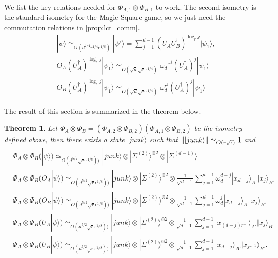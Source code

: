 \documentclass[11pt,letterpaper]{article}
\newcommand{\ket}[1]{|#1\rangle}
\newcommand{\x}{\otimes}
\newcommand{\ct}{^{\dagger}}
\DeclarePairedDelimiter{\norm}{\lVert}{\rVert}
\newcommand{\1}{\mathbb{1}}
\newcommand{\EPR}[1]{\Sigma^{(#1)}}
\newcommand{\ep}{\epsilon}
\newcommand{\se}{\sqrt{\epsilon}}
\newcommand{\qe}{\epsilon^{1/4}}
\newcommand{\sd}{\sqrt{d}}
\newcommand{\sr}{\sqrt{r}}
\newcommand{\appd}[1]{\simeq_{#1}}
\newtheorem{theorem}{Theorem}
\theoremstyle{definition}
\begin{document}
We list the key relations needed for $\Phi_{A,1} \x \Phi_{B,1}$ to work.
The second isometry is the standard isometry for the Magic Square game, so we just need the commutation relations in
\cref{prop:lct_comm}.
\begin{align}
	&\ket{\psi} \appd{O(d^{7/4} r^{1/4} \ep^{1/8})}\ket{\psi'} = \sum_{j=1}^{d-1} (U_A\ct U_B\ct)^{\log_r j} \ket{\psi_1},\\
	&O_A(U_A\ct)^{\log_r j} \ket{\psi_1} \appd{O(\sd \sr \qe)}\omega_d^{-r^j}  (U_A\ct)^j \ket{\psi_1}\\
	&O_B(U_A\ct)^{\log_r j} \ket{\psi_1} \appd{O(\sd \sr \qe)}\omega_d^{r^j}  (U_A\ct)^j \ket{\psi_1}
\end{align}

The result of this section is summarized in the theorem below.
\begin{theorem}
	Let $\Phi_A \x \Phi_B = (\Phi_{A,2} \x \Phi_{B,2})(\Phi_{A,1}\x\Phi_{B,2})$ be the isometry defined above, then there exists a state $\ket{junk}$
	such that $\norm{\ket{junk}} \appd{O(r\se)} 1$ and 
	\begin{align}
		&\Phi_A \x \Phi_B (\ket{\psi}) \appd{O(d^{5/2}\sr \ep^{1/8}))} \ket{junk} \x \ket{\EPR{2}}^{\x 2} \x \ket{\EPR{d-1}}\\	
		&\Phi_A \x \Phi_B (O_A\ket{\psi}) \appd{O(d^{5/2}\sr \ep^{1/8}))} \ket{junk} \x \ket{\EPR{2}}^{\x 2} \x
		\frac{1}{\sqrt{d-1}}\sum_{j=1}^{d-1} \omega_d^{d-j}\ket{x_{d-j}}_{A'}\ket{x_j}_{B'} \\
		&\Phi_A \x \Phi_B (O_B\ket{\psi}) \appd{O(d^{5/2}\sr \ep^{1/8}))} \ket{junk} \x \ket{\EPR{2}}^{\x 2} \x
		\frac{1}{\sqrt{d-1}}\sum_{j=1}^{d-1} \omega_d^{j}\ket{x_{d-j}}_{A'}\ket{x_j}_{B'}\\
		&\Phi_A \x \Phi_B (U_A\ket{\psi}) \appd{O(d^{5/2}\sr \ep^{1/8}))} \ket{junk} \x \ket{\EPR{2}}^{\x 2} \x
		\frac{1}{\sqrt{d-1}}\sum_{j=1}^{d-1} \ket{x_{(d-j)r^{-1}}}_{A'}\ket{x_j}_{B'} \\
		&\Phi_A \x \Phi_B (U_B\ket{\psi}) \appd{O(d^{5/2}\sr \ep^{1/8}))} \ket{junk} \x \ket{\EPR{2}}^{\x 2} \x
		\frac{1}{\sqrt{d-1}}\sum_{j=1}^{d-1} \ket{x_{d-j}}_{A'}\ket{x_{j r^{-1}}}_{B'}.
	\end{align}
\end{theorem}
\end{document}
